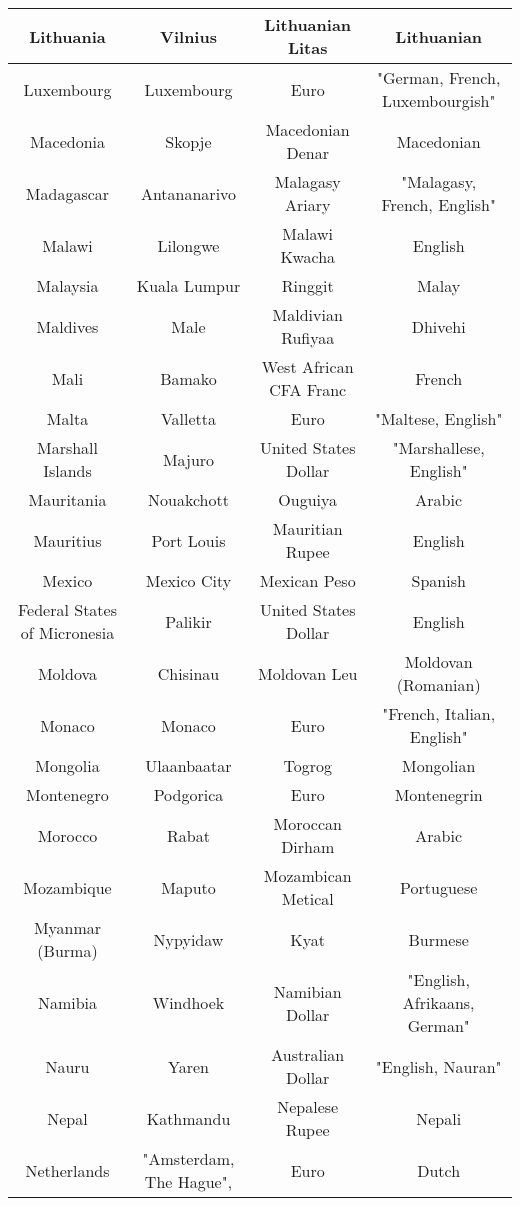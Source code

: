 \documentclass{article}
\begin{document}
\begin{center}
\begin{tabular}{||  c c c c  ||}
Lithuania & Vilnius & Lithuanian Litas & Lithuanian   \\ \hline 
Luxembourg & Luxembourg & Euro & "German, French, Luxembourgish"   \\ \hline 
Macedonia & Skopje & Macedonian Denar & Macedonian   \\ \hline 
Madagascar & Antananarivo & Malagasy Ariary & "Malagasy, French, English"   \\ \hline 
Malawi & Lilongwe & Malawi Kwacha & English   \\ \hline 
Malaysia & Kuala Lumpur & Ringgit & Malay   \\ \hline 
Maldives & Male & Maldivian Rufiyaa & Dhivehi   \\ \hline 
Mali & Bamako & West African CFA Franc & French   \\ \hline 
Malta & Valletta & Euro & "Maltese, English"   \\ \hline 
Marshall Islands & Majuro & United States Dollar & "Marshallese, English"   \\ \hline 
Mauritania & Nouakchott & Ouguiya & Arabic   \\ \hline 
Mauritius & Port Louis & Mauritian Rupee & English   \\ \hline 
Mexico & Mexico City & Mexican Peso & Spanish   \\ \hline 
Federal States of Micronesia & Palikir & United States Dollar & English   \\ \hline 
Moldova & Chisinau & Moldovan Leu & Moldovan (Romanian)   \\ \hline 
Monaco & Monaco & Euro & "French, Italian, English"   \\ \hline 
Mongolia & Ulaanbaatar & Togrog & Mongolian   \\ \hline 
Montenegro & Podgorica & Euro & Montenegrin   \\ \hline 
Morocco & Rabat & Moroccan Dirham & Arabic   \\ \hline 
Mozambique & Maputo & Mozambican Metical & Portuguese   \\ \hline 
Myanmar (Burma) & Nypyidaw & Kyat & Burmese   \\ \hline 
Namibia & Windhoek & Namibian Dollar & "English, Afrikaans, German"   \\ \hline 
Nauru & Yaren & Australian Dollar & "English, Nauran"   \\ \hline 
Nepal & Kathmandu & Nepalese Rupee & Nepali   \\ \hline 
Netherlands & "Amsterdam, The Hague", & Euro & Dutch   \\ \hline 

\end{tabular}
\end{center}
\end{document}
